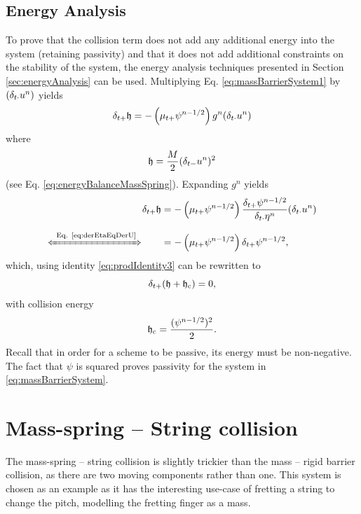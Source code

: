 \subsection{Energy Analysis}
To prove that the collision term does not add any additional energy into the system (retaining passivity) and that it does not add additional constraints on the stability of the system, the energy analysis techniques presented in Section \ref{sec:energyAnalysis} can be used. Multiplying Eq. \eqref{eq:massBarrierSystem1} by $(\delta_{t\cdot} u^n)$ yields 
\begin{equation*}
    \delta_{t+} \mathfrak{h}  = -\left(\mu_{t+}\psi^{n-1/2}\right)g^n (\delta_{t\cdot} u^n)
\end{equation*}
where
\begin{equation}
    \mathfrak{h} = \frac{M}{2}(\delta_{t-}u^n)^2
\end{equation}
(see Eq. \eqref{eq:energyBalanceMassSpring}). Expanding $g^n$ yields 
\begin{align*}
    \dtp \h  &= -\left(\mtp\psi^{n-1/2}\right)\frac{\dtp \psi^{n-1/2}}{\dtd \eta^n}(\dtd \un)\\
    \xLeftrightarrow{\mystrut\ \text{Eq. \eqref{eq:derEtaEqDerU}}} \qquad & = -\left(\mtp\psi^{n-1/2}\right)\dtp \psi^{n-1/2},
\end{align*}
which, using identity \eqref{eq:prodIdentity3} can be rewritten to 
\begin{equation}
    \delta_{t+}(\mathfrak{h} + \mathfrak{h}_{\text{c}}) = 0,
\end{equation}
with collision energy
\begin{equation*}
    \mathfrak{h}_{\text{c}} = \frac{(\psi^{n-1/2})^2}{2}.
\end{equation*}
Recall that in order for a scheme to be passive, its energy must be non-negative. The fact that $\psi$ is squared proves passivity for the system in \eqref{eq:massBarrierSystem}.

\section{Mass-spring -- String collision}\label{sec:massString}
The mass-spring -- string collision is slightly trickier than the mass -- rigid barrier collision, as there are two moving components rather than one. This system is chosen as an example as it has the interesting use-case of fretting a string to change the pitch, modelling the fretting finger as a mass.

